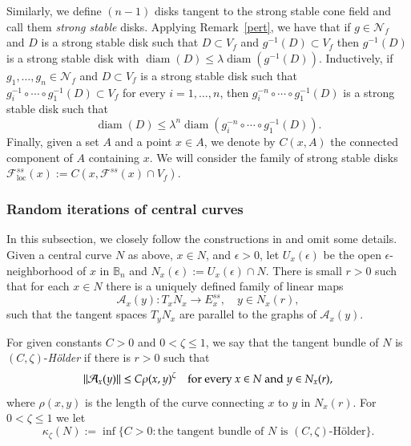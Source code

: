 \documentclass[11pt,reqno]{amsart}
\theoremstyle{plain}
\newtheorem*{theorem A}{Theorem A}
\newtheorem*{theorem B}{Theorem B}
\newtheorem*{theorem C}{Theorem C}
\newtheorem*{theorem 1}{Theorem 1}
\newtheorem*{theorem 2}{Theorem 2}
\newtheorem*{theorem 3}{Theorem 3}
\DeclareMathOperator{\diam}{diam}
\numberwithin{equation}{section}
\begin{document}
Similarly, we define $(n-1)$ disks tangent to the strong stable cone field and call them \emph{strong stable} disks.
Applying Remark~\ref{pert}, we have that if $g \in \mathcal{N}_f$ and $D$ is a strong stable disk such that $D\subset V_f$ and $g^{-1}(D) \subset V_f$ then $g^{-1}(D)$ is a strong stable disk with $\diam (D) \le \lambda \diam (g^{-1} (D))$.
Inductively, if $g_1, \dots, g_n \in \mathcal{N}_f$ and $D\subset V_f$ is a strong stable disk such that $g_i^{-1} \circ \cdots \circ g_1^{-1} (D) \subset V_f$ for every $i=1, \dots, n$, then $g_i^{-n} \circ \cdots \circ g_1^{-1} (D)$ is a strong stable disk such that
\begin{equation}
\label{e.stablecompositions}
\diam (D) \le \lambda^n \diam (g_i^{-n} \circ \cdots \circ g_1^{-1} (D)).
\end{equation}
Finally, given a set $A$ and a point $x\in A$, we denote by $C(x,A)$ the connected component of $A$ containing $x$.
We will consider the family of strong stable disks $\mathcal{F}^{ss}_{\mathrm{loc}}(x):= C(x,\mathcal{F}^{ss} (x)\cap V_f)$.

\subsubsection{Random iterations of central curves}
\label{sss.iterationsofcentralcurves}

In this subsection, we closely follow the constructions in \cite[Section 2.1]{alves2000srb} and omit some details.
Given a central curve $N$ as above, $x\in N$, and $\epsilon>0$, let $U_x (\epsilon)$ be the open $\epsilon$-neighborhood of $x$ in $\mathbb{B}_n$ and $N_x(\epsilon) := U_x(\epsilon) \cap N$.
There is small $r>0$ such that for each $x\in N$ there is a uniquely defined family of linear maps
$$
\mathcal{A}_x(y) \colon T_x N_x \to E_x^{ss}, \quad y \in N_x(r),
$$
such that the tangent spaces $T_y N_x$ are parallel to the graphs of $\mathcal{A}_x(y)$.

For given constants $C> 0$ and $0< \zeta \leq 1$, we say that the tangent bundle of $N$ is $(C, \zeta)$-\emph{H\"{o}lder} if there is $r>0$ such that
\begin{equation}\label{L}
\|\mathcal{A}_x(y)\| \leq C \rho(x, y)^{\zeta} \quad \textnormal{for every $x\in N$ and $y \in N_x (r)$},
\end{equation}
where $\rho(x, y)$ is the length of the curve connecting $x$ to $y$ in $N_x(r)$.
For $0< \zeta \leq 1$ we let
\begin{equation}
\label{e.curvaturek}
\kappa_\zeta(N):=\inf \{C > 0: \text{the tangent bundle of $N$ is $(C, \zeta)$-H\"{o}lder}\}.
\end{equation}
\end{document}
